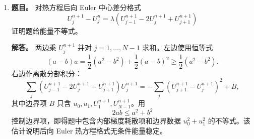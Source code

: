 ﻿\documentclass[UTF8,12pt]{ctexart}
\begin{document}
\begin{enumerate}[label=\textbf{\arabic*.},leftmargin=2.2em]
\textbf{解答。} 误差满足
\[
e^{(k+1)}=(I-\omega A)e^{(k)}.
\]
收敛当且仅当
\[
\rho(I-\omega A)=\max_i|1-\omega\lambda_i|<1,
\]
即
\[
0<\omega<\frac2{\lambda_n}.
\]
要最小化
\[
\max_{\lambda\in[\lambda_1,\lambda_n]}|1-\omega\lambda|,
\]
应使两端误差相等：
\[
1-\omega\lambda_1=-(1-\omega\lambda_n).
\]
故
\[
\omega_{\rm opt}=\frac2{\lambda_1+\lambda_n},
\qquad
\rho(G_{\omega_{\rm opt}})
=\frac{\lambda_n-\lambda_1}{\lambda_n+\lambda_1}.
\]
若 \(A\) 对称正定，则 \(\kappa_2(A)=\lambda_n/\lambda_1\)，所以
\[
\rho(G_{\omega_{\rm opt}})
=\frac{\kappa_2(A)-1}{\kappa_2(A)+1}.
\]

\item \textbf{题目。} 对热方程后向 Euler 中心差分格式
\[
U_j^{n+1}-U_j^n=\lambda(U_{j-1}^{n+1}-2U_j^{n+1}+U_{j+1}^{n+1})
\]
证明题给能量不等式。

\textbf{解答。} 两边乘 \(U_j^{n+1}\) 并对 \(j=1,\ldots,N-1\) 求和。左边使用恒等式
\[
(a-b)a=\frac12(a^2-b^2)+\frac12(a-b)^2
\ge \frac12(a^2-b^2).
\]
右边作离散分部积分：
\[
\sum_j (U_{j-1}^{n+1}-2U_j^{n+1}+U_{j+1}^{n+1})U_j^{n+1}
=-\sum_j (U_{j+1}^{n+1}-U_j^{n+1})^2+B,
\]
其中边界项 \(B\) 只含 \(u_0,u_1,U_1^{n+1},U_{N-1}^{n+1}\)。用
\[
2ab\le a^2+b^2
\]
控制边界项，即得题中包含内部梯度耗散项和边界数据 \(u_0^2+u_1^2\) 的不等式。该估计说明后向 Euler 热方程格式无条件能量稳定。
\end{enumerate}
\end{document}
